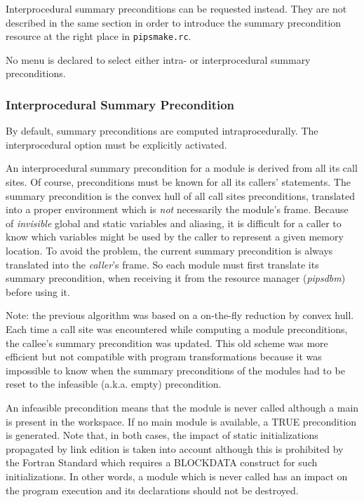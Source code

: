 \documentclass[a4paper]{report}
\newenvironment{PipsPass}[1]{\label{pass:#1}}{}
\begin{document}
Interprocedural summary preconditions can be requested instead. They are
not described in the same section in order to introduce the summary
precondition resource at the right place in \verb/pipsmake.rc/.

No menu is declared to select either intra- or interprocedural summary
preconditions.

\subsubsection{Interprocedural Summary Precondition}

By default, summary preconditions are computed intraprocedurally. The
interprocedural option must be explicitly activated.

\begin{PipsPass}{interprocedural_summary_precondition}
An interprocedural summary precondition for a module is derived from all
its call sites. Of course, preconditions must be known for all its
callers' statements.  The summary precondition is the convex hull of all
call sites preconditions, translated into a proper environment which is
{\em not} necessarily the module's frame. Because of {\em invisible}
global and static variables and aliasing, it is difficult for a caller to
know which variables might be used by the caller to represent a given
memory location. To avoid the problem, the current summary precondition is
always translated into the {\em caller}'s frame. So each module must first
translate its summary precondition, when receiving it from the resource
manager ({\em pipsdbm}) before using it.
\end{PipsPass}

Note: the previous algorithm was based on a on-the-fly reduction by
convex hull. Each time a call site was encountered while computing a
module preconditions, the callee's summary precondition was updated. This
old scheme was more efficient but not compatible with program
transformations because it was impossible to know when the summary
preconditions of the modules had to be reset to the infeasible
(a.k.a. empty) precondition.

An infeasible precondition means that the module is never called although
a main is present in the workspace. If no main module is available, a TRUE
precondition is generated. Note that, in both cases, the impact of static
initializations propagated by link edition is taken into account although
this is prohibited by the Fortran Standard which requires a BLOCKDATA
construct for such initializations. In other words, a module which is
never called has an impact on the program execution and its declarations
should not be destroyed.
\end{document}
